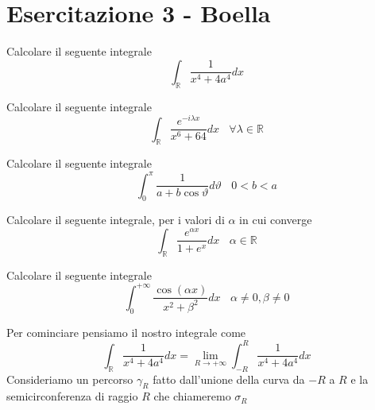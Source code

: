 \chapter{Esercitazione 3 - Boella}
\ParteEsercizi
\Esercizio{}

Calcolare il seguente integrale
\begin{equation*}
\int _{\mathbb{R}}\frac{1}{x^{4} +4a^{4}} dx
\end{equation*}
\Esercizio{}

Calcolare il seguente integrale
\begin{equation*}
\int _{\mathbb{R}}\frac{e^{-i\lambda x}}{x^{6} +64} dx\ \ \ \ \forall \lambda \in \mathbb{R}
\end{equation*}
\Esercizio{}

Calcolare il seguente integrale
\begin{equation*}
\int ^{\pi }_{0}\frac{1}{a+b\cos \vartheta } d\vartheta \ \ \ \ 0< b< a
\end{equation*}
\Esercizio{}

Calcolare il seguente integrale, per i valori di $\alpha $ in cui converge
\begin{equation*}
\int _{\mathbb{R}}\frac{e^{\alpha x}}{1+e^{x}} dx\ \ \ \ \alpha \in \mathbb{R}
\end{equation*}
\Esercizio{}

Calcolare il seguente integrale
\begin{equation*}
\int ^{+\infty }_{0}\frac{\cos\left( \alpha x\right)}{x^{2} +\beta ^{2}} dx\ \ \ \ \alpha \neq 0,\beta \neq 0
\end{equation*}
\ParteSoluzioni
\Soluzione

Per cominciare pensiamo il nostro integrale come
\begin{equation*}
\int _{\mathbb{R}}\frac{1}{x^{4} +4a^{4}} dx=\lim\limits _{R\rightarrow +\infty }\int ^{R}_{-R}\frac{1}{x^{4} +4a^{4}} dx
\end{equation*}
Consideriamo un percorso $\gamma _{R}$ fatto dall'unione della curva da $-R$ a $R$ e la semicirconferenza di raggio $R$ che chiameremo $\sigma _{R}$


